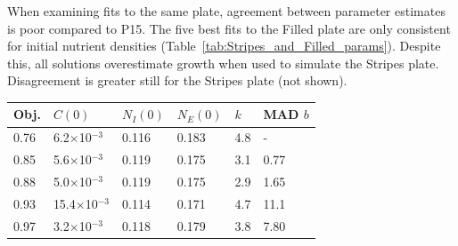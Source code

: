 \begin{multicols}{2}
When examining fits to the same plate, agreement between parameter
estimates is poor compared to P15. The five best fits to the Filled
plate are only consistent for initial nutrient densities
(Table~\ref{tab:Stripes_and_Filled_params}). Despite this, all
solutions overestimate growth when used to simulate the Stripes
plate. Disagreement is greater still for the Stripes plate (not
shown).
\begin{center}
  \begin{tabular}{l l l l l l}
    \hline
    Obj.  & \(C(0)\)                  & \(N_{I}(0)\) & \(N_{E}(0)\) & \(k\) & MAD \(b\)\\
    \hline
    0.76  & 6.2\(\times\)10\(^{-3}\)   & 0.116       & 0.183    & 4.8  & -    \\
    0.85  & 5.6\(\times\)10\(^{-3}\)   & 0.119       & 0.175    & 3.1  & 0.77 \\
    0.88  & 5.0\(\times\)10\(^{-3}\)   & 0.119       & 0.175    & 2.9  & 1.65 \\
    0.93  & 15.4\(\times\)10\(^{-3}\)  & 0.114       & 0.171    & 4.7  & 11.1 \\
    0.97  & 3.2\(\times\)10\(^{-3}\)   & 0.118       & 0.179    & 3.8  & 7.80 \\
    \hline
  \end{tabular}
  \label{tab:Filled_best_fits}
\end{center}



\end{multicols}

